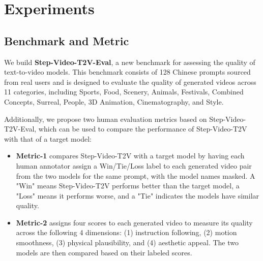 

\section{Experiments}

\subsection{Benchmark and Metric}
We build \textbf{Step-Video-T2V-Eval}, a new benchmark for assessing the quality of text-to-video models. This benchmark consists of 128 Chinese prompts sourced from real users and is designed to evaluate the quality of generated videos across 11 categories, including Sports, Food, Scenery, Animals, Festivals, Combined Concepts, Surreal, People, 3D Animation, Cinematography, and Style.

Additionally, we propose two human evaluation metrics based on Step-Video-T2V-Eval, which can be used to compare the performance of Step-Video-T2V with that of a target model:
\begin{itemize}[left=0cm] 
\item \textbf{Metric-1} compares Step-Video-T2V with a target model by having each human annotator assign a Win/Tie/Loss label to each generated video pair from the two models for the same prompt, with the model names masked. A "Win" means Step-Video-T2V performs better than the target model, a "Loss" means it performs worse, and a "Tie" indicates the models have similar quality.
\item \textbf{Metric-2} assigns four scores to each generated video to measure its quality across the following 4 dimensions: (1) instruction following, (2) motion smoothness, (3) physical plausibility, and (4) aesthetic appeal. 
The two models are then compared based on their labeled scores. 
\end{itemize}

